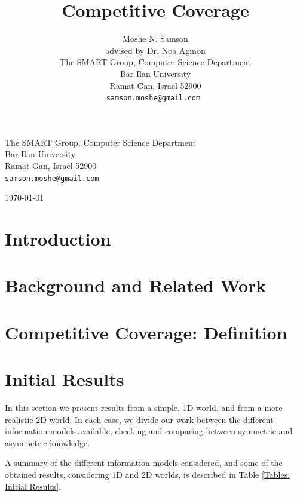 \documentclass[a4paper,english,10pt]{article}
\begin{document}
\begin{titlepage}
\begin{center}
\vfill


\large{The SMART Group, Computer Science Department\\
Bar Ilan University\\
Ramat Gan, Israel 52900\\
\tt\small samson.moshe@gmail.com}

\vfill

\today

\end{center}
\end{titlepage}

\title{Competitive Coverage}
\author{Moshe N. Samson\\
advised by Dr. Noa Agmon\\
The SMART Group, Computer Science Department\\
Bar Ilan University\\
Ramat Gan, Israel 52900\\
\tt\small samson.moshe@gmail.com
}

\tableofcontents
\maketitle

\section{Introduction}


\section{Background and Related Work}


\section{Competitive Coverage: Definition}



\section{Initial Results}
In this section we present results from a simple, 1D world, and from a more realistic 2D world. In each case, we divide our work between the different information-models available, checking and comparing between symmetric and asymmetric knowledge.

A summary of the different information models considered, and some of the obtained results, considering 1D and 2D worlds, is described in Table \ref{Tables: Initial Results}.
  
\end{document}
